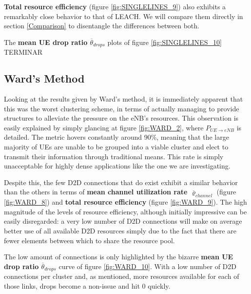 \textbf{Total resource efficiency} (figure \ref{fig:SINGLELINES_9}) also exhibits a remarkably close behavior to that of LEACH. We will compare them directly in section \ref{Comparison} to disentangle the differences between both.

The \textbf{mean UE drop ratio $\overline{\theta}_{drops}$} plots of figure \ref{fig:SINGLELINES_10} TERMINAR

\subsection{Ward's Method} \label{description:WARD}

Looking at the results given by Ward's method, it is immediately apparent that this was the worst clustering scheme, in terms of actually managing to provide structures to alleviate the pressure on the eNB's resources. This observation is easily explained by simply glancing at figure \ref{fig:WARD_2}, where $P_{UE\rightarrow eNB}$ is detailed. The metric hovers constantly around 90\%, meaning that the large majority of UEs are unable to be grouped into a viable cluster and elect to transmit their information through traditional means. This rate is simply unacceptable for highly dense applications like the one we are investigating.

Despite this, the few D2D connections that do exist exhibit a similar behavior than the others in terms of \textbf{mean channel utilization rate $\overline{\varrho}_{channel}$} (figure \ref{fig:WARD_8}) and \textbf{total resource efficiency} (figure \ref{fig:WARD_9}). The high magnitude of the levels of resource efficiency, although initially impressive can be easily disregarded: a very low number of D2D connections will make on average better use of all available D2D resources simply due to the fact that there are fewer elements between which to share the resource pool.

The low amount of connections is only highlighted by the bizarre \textbf{mean UE drop ratio $\overline{\theta}_{drops}$} curve of figure \ref{fig:WARD_10}. With a low number of D2D connections per cluster and, as mentioned, more resources available for each of those links, drops become a non-issue and hit 0 quickly.


